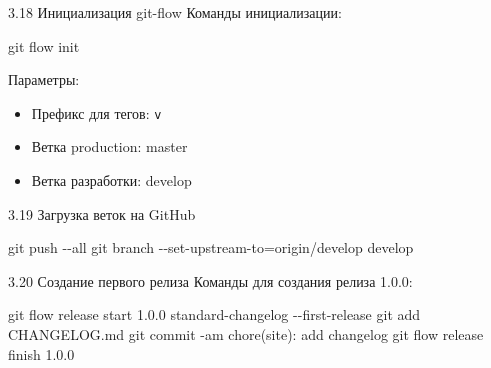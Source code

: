 \documentclass[
  ignorenonframetext,
  aspectratio=169,
  russian,
]{beamer}
\newenvironment{Shaded}{\begin{snugshade}}{\end{snugshade}}
\newcommand{\AttributeTok}[1]{\textcolor[rgb]{0.40,0.45,0.13}{#1}}
\newcommand{\ExtensionTok}[1]{\textcolor[rgb]{0.00,0.23,0.31}{#1}}
\newcommand{\FunctionTok}[1]{\textcolor[rgb]{0.28,0.35,0.67}{#1}}
\newcommand{\NormalTok}[1]{\textcolor[rgb]{0.00,0.23,0.31}{#1}}
\newcommand{\OperatorTok}[1]{\textcolor[rgb]{0.37,0.37,0.37}{#1}}
\newcommand{\StringTok}[1]{\textcolor[rgb]{0.13,0.47,0.30}{#1}}
\providecommand{\tightlist}{%
  \setlength{\itemsep}{0pt}\setlength{\parskip}{0pt}}
\begin{document}
\begin{frame}[fragile]{3.18 Инициализация git-flow}
\label{ux438ux43dux438ux446ux438ux430ux43bux438ux437ux430ux446ux438ux44f-git-flow}
Команды инициализации:

\begin{Shaded}
\begin{Highlighting}[]
\FunctionTok{git}\NormalTok{ flow init}
\end{Highlighting}
\end{Shaded}

Параметры:

\begin{itemize}[<+->]
\tightlist
\item
  Префикс для тегов: \texttt{v}
\item
  Ветка production: master
\item
  Ветка разработки: develop
\end{itemize}
\end{frame}

\begin{frame}[fragile]{3.19 Загрузка веток на GitHub}
\label{ux437ux430ux433ux440ux443ux437ux43aux430-ux432ux435ux442ux43eux43a-ux43dux430-github}
\begin{Shaded}
\begin{Highlighting}[]
\FunctionTok{git}\NormalTok{ push }\AttributeTok{{-}{-}all}
\FunctionTok{git}\NormalTok{ branch }\AttributeTok{{-}{-}set{-}upstream{-}to}\OperatorTok{=}\NormalTok{origin/develop develop}
\end{Highlighting}
\end{Shaded}
\end{frame}

\begin{frame}[fragile]{3.20 Создание первого релиза}
\label{ux441ux43eux437ux434ux430ux43dux438ux435-ux43fux435ux440ux432ux43eux433ux43e-ux440ux435ux43bux438ux437ux430}
Команды для создания релиза 1.0.0:

\begin{Shaded}
\begin{Highlighting}[]
\FunctionTok{git}\NormalTok{ flow release start 1.0.0}
\ExtensionTok{standard{-}changelog} \AttributeTok{{-}{-}first{-}release}
\FunctionTok{git}\NormalTok{ add CHANGELOG.md}
\FunctionTok{git}\NormalTok{ commit }\AttributeTok{{-}am} \StringTok{\textquotesingle{}chore(site): add changelog\textquotesingle{}}
\FunctionTok{git}\NormalTok{ flow release finish 1.0.0}
\end{Highlighting}
\end{Shaded}
\end{frame}
\end{document}
